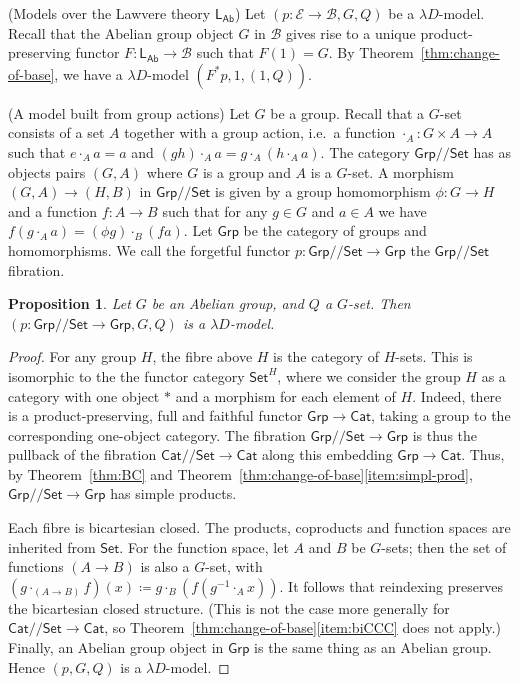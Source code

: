 \documentclass[a4paper,UKenglish]{lipics}
\newtheorem{proposition}[theorem]{Proposition}
\newcommand{\msf}[1]{\mathsf{#1}} %
\newcommand{\Grp}{\msf{Grp}}
\newcommand{\Set}{\msf{Set}}
\newcommand{\Cat}{\msf{Cat}}
\newcommand{\LAb}{\msf{L}_{\msf{Ab}}}
\newcommand{\B}{\mathcal{B}}
\newcommand{\E}{\mathcal{E}}
\newcommand{\Lslice}[1]{#1/\!/\Set}
\newcommand{\GrpSet}{\Lslice{\Grp}}
\newcommand{\CatSet}{\Lslice{\Cat}}
\begin{document}
\begin{example}(Models over the Lawvere theory $\LAb$)
\label{ex:Lawvere}
Let $(p:\E\to\B,G,Q)$ be a $\lambda D$-model.  Recall that the Abelian
group object $G$ in $\B$ gives rise to a unique product-preserving
functor $F:\LAb\to \B$ such that $F(1)=G$.
By Theorem~\ref{thm:change-of-base}, we have a $\lambda D$-model
$(F^\ast p,1,(1, Q))$.
\end{example}

\begin{example}(A model built from group actions)
\label{ex:MonAct}
Let $G$ be a group. Recall that a $G$-set consists of a set $A$
together with a group action, i.e.\ a function $\cdot_A:G\times
A\to A$ such that $e\cdot_{A} a=a$ and $(gh)\cdot_A a=g\cdot_A
(h\cdot_A a)$. The category $\GrpSet$ has as objects pairs $(G,A)$
where $G$ is a group and $A$ is a $G$-set. A morphism $(G,A)
\rightarrow (H,B)$ in $\GrpSet$ is given by a group homomorphism
$\phi:G\rightarrow H$ and a function $f:A \rightarrow B$ such that for
any $g\in G$ and $a\in A$ we have $f (g\cdot_A a) = (\phi g)\cdot_B (f
a)$.
%
Let $\Grp$ be the category of groups and homomorphisms. We call the forgetful functor $p : \GrpSet\to \Grp$ the $\GrpSet$ fibration.

\begin{proposition}
Let $G$ be an Abelian group, and $Q$ a $G$-set. Then $(p : \GrpSet \rightarrow \Grp,G,Q)$ is a $\lambda D$-model.
\end{proposition}
\begin{proof}
For any group $H$, the fibre above $H$ is the category of $H$-sets.
This is isomorphic to the
the functor category ${\Set}^H$,
where we consider the group $H$ as a category with one object $*$
and a morphism for each element of $H$.
Indeed, there is a product-preserving, full and faithful functor $\Grp\to\Cat$,
taking a group to the corresponding one-object category.
The fibration $\GrpSet\to\Grp$ is thus the pullback of
the fibration $\CatSet\to\Cat$ along this embedding $\Grp \to \Cat$.
Thus, by Theorem~\ref{thm:BC} and Theorem~\ref{thm:change-of-base}\eqref{item:simpl-prod},
$\GrpSet\to\Grp$ has simple products.

Each fibre is bicartesian closed.
The products, coproducts and function spaces are inherited from $\Set$.
For the function space, let $A$ and $B$ be $G$-sets;
then the set of functions $(A\to B)$ is also a $G$-set,
with $(g\cdot_{(A\to B)}f)(x)\coloneqq g\cdot_B(f(g^{-1}\cdot_A x))$.
It follows that reindexing preserves the bicartesian closed structure.
(This is not the case more generally for $\CatSet\to\Cat$, so Theorem~\ref{thm:change-of-base}\eqref{item:biCCC} does not apply.)
%
Finally, an Abelian group object in $\Grp$ is the same thing as an Abelian group. Hence $(p,G,Q)$ is a $\lambda D$-model.
\end{proof}


\end{example}
\end{document}
